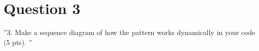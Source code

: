 \section{Question 3}

''3. Make a sequence diagram of how the pattern works dynamically in your code (5 pts). ''
